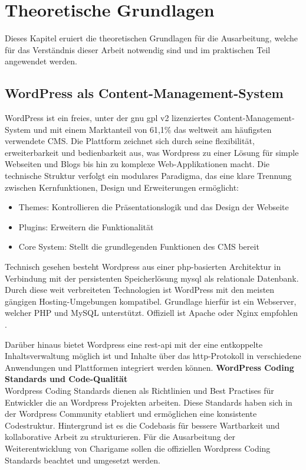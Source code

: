 \chapter{Theoretische Grundlagen}
Dieses Kapitel eruiert die theoretischen Grundlagen für die Ausarbeitung, welche für das Verständnis dieser Arbeit notwendig sind und im praktischen Teil angewendet werden.
\section{WordPress als Content-Management-System}
WordPress ist ein freies, unter der \gls{gnu} \gls{gpl} v2 lizenziertes Content-Management-System und mit einem Marktanteil von 61,1\% das weltweit am häufigsten verwendete CMS. \cite{statista2025cms}
Die Plattform zeichnet sich durch seine flexibilität, erweiterbarkeit und bedienbarkeit aus, was Wordpress zu einer Lösung für simple Webseiten und Blogs bis hin zu komplexe Web-Applikationen macht. \cite{patel2019review}
Die technische Struktur verfolgt ein modulares Paradigma, das eine klare Trennung zwischen Kernfunktionen, Design und Erweiterungen ermöglicht:
\begin{itemize}

 \item Themes: Kontrollieren die Präsentationslogik und das Design der Webseite

 \item Plugins: Erweitern die Funktionalität

 \item Core System: Stellt die grundlegenden Funktionen des CMS bereit

\end{itemize}
Technisch gesehen besteht Wordpress aus einer \gls{php}-basierten Architektur in Verbindung mit der persistenten Speicherlösung \gls{mysql} als relationale Datenbank.
Durch diese weit verbreiteten Technologien ist WordPress mit den meisten gängigen Hosting-Umgebungen kompatibel.
Grundlage hierfür ist ein Webserver, welcher PHP und MySQL unterstützt.
Offiziell ist Apache oder Nginx empfohlen \cite{wordpress2024requirements}.

Darüber hinaus bietet Wordpress eine \gls{rest}-\gls{api} mit der eine entkoppelte Inhaltsverwaltung möglich ist und Inhalte über das \gls{http}-Protokoll in verschiedene Anwendungen und Plattformen integriert werden können.
\newpage
\textbf{WordPress Coding Standards und Code-Qualität}\\
Wordpress Coding Standards dienen als Richtlinien und Best Practises für Entwickler die an Wordpress Projekten arbeiten.
Diese Standards haben sich in der Wordpress Community etabliert und ermöglichen eine konsistente Codestruktur.
Hintergrund ist es die Codebasis für bessere Wartbarkeit und kollaborative Arbeit zu strukturieren.
Für die Ausarbeitung der Weiterentwicklung von Charigame sollen die offiziellen Wordpress Coding Standards beachtet und umgesetzt werden.


